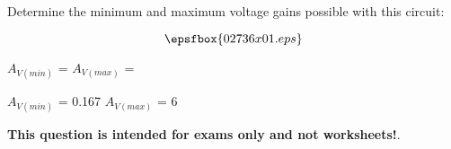 

Determine the minimum and maximum voltage gains possible with this circuit:

$$\epsfbox{02736x01.eps}$$

$A_{V(min)}$ = \hskip 80pt $A_{V(max)}$ =







$A_{V(min)}$ = 0.167 \hskip 30pt $A_{V(max)}$ = 6







{\bf This question is intended for exams only and not worksheets!}.




